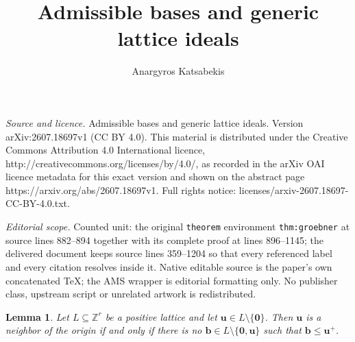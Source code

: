 \documentclass[10pt,a4paper]{amsart}
\newtheorem{lemma}[theorem]{Lemma}
\begin{document}
\title[Admissible bases and generic lattice ideals]{Admissible bases and generic lattice ideals}
\author{Anargyros Katsabekis}
\date{}
\maketitle
\noindent\emph{Source and licence.} Admissible bases and generic lattice ideals. Version arXiv:2607.18697v1 (CC BY 4.0). This material is distributed under the Creative Commons Attribution 4.0 International licence, http://creativecommons.org/licenses/by/4.0/, as recorded in the arXiv OAI licence metadata for this exact version and shown on the abstract page https://arxiv.org/abs/2607.18697v1. Full rights notice: licenses/arxiv-2607.18697-CC-BY-4.0.txt.\par\smallskip
\noindent\textit{Editorial scope.} Counted unit: the original \texttt{theorem} environment \texttt{thm:groebner} at source lines 882--894 together with its complete proof at lines 896--1145; the delivered document keeps source lines 359--1204 so that every referenced label and every citation resolves inside it. Native editable source is the paper's own concatenated TeX; the AMS wrapper is editorial formatting only. No publisher class, upstream script or unrelated artwork is redistributed.
\begin{lemma}\label{lem:neighbor}
Let $L\subseteq\mathbb Z^r$ be a positive lattice and let
$\mathbf u\in L\setminus\{\mathbf0\}$.
Then $\mathbf u$ is a neighbor of the origin if and only if there is
no $\mathbf b\in L\setminus\{\mathbf0,\mathbf u\}$ such that
$\mathbf b\le\mathbf u^+$.
\end{lemma}
\end{document}
